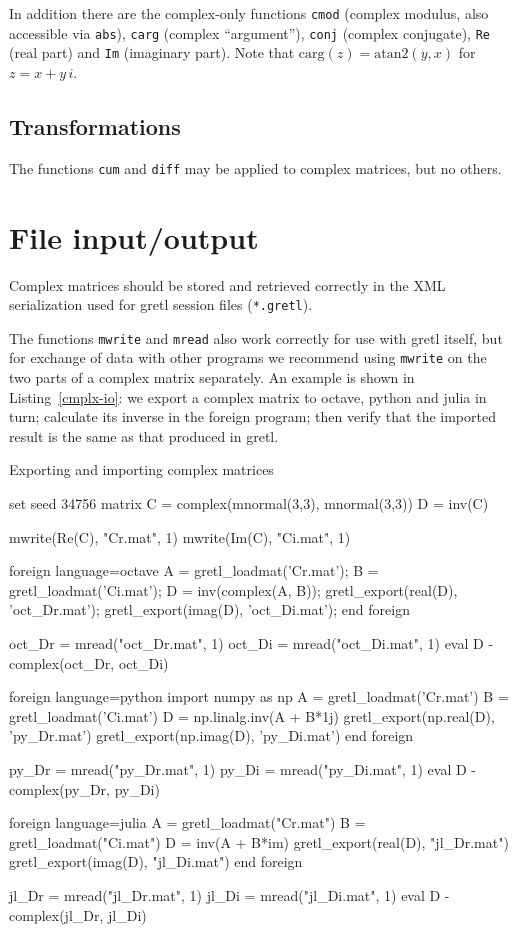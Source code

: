 \documentclass{article}
\begin{document}
In addition there are the complex-only functions \texttt{cmod}
(complex modulus, also accessible via \texttt{abs}), \texttt{carg}
(complex ``argument''), \texttt{conj} (complex conjugate), \texttt{Re}
(real part) and \texttt{Im} (imaginary part). Note that
$\mbox{carg}(z) = \mbox{atan2}(y,x)$ for $z=x + y\,i$.

\subsection{Transformations}

The functions \texttt{cum} and \texttt{diff} may be applied to complex
matrices, but no others.

\section{File input/output}

Complex matrices should be stored and retrieved correctly in the
XML serialization used for gretl session files (\texttt{*.gretl}).

The functions \texttt{mwrite} and \texttt{mread} also work correctly
for use with gretl itself, but for exchange of data with other
programs we recommend using \texttt{mwrite} on the two parts of a
complex matrix separately. An example is shown in
Listing~\ref{cmplx-io}: we export a complex matrix to \textsf{octave},
\textsf{python} and \textsf{julia} in turn; calculate its inverse in
the foreign program; then verify that the imported result is the same
as that produced in gretl.

\begin{script}[htbp]
  \caption{Exporting and importing complex matrices}
  \label{cmplx-io}
\begin{scode}
set seed 34756
matrix C = complex(mnormal(3,3), mnormal(3,3))
D = inv(C)

mwrite(Re(C), "Cr.mat", 1)
mwrite(Im(C), "Ci.mat", 1)

foreign language=octave
  A = gretl_loadmat('Cr.mat');
  B = gretl_loadmat('Ci.mat');
  D = inv(complex(A, B));
  gretl_export(real(D), 'oct_Dr.mat');
  gretl_export(imag(D), 'oct_Di.mat');
end foreign

oct_Dr = mread("oct_Dr.mat", 1)
oct_Di = mread("oct_Di.mat", 1)
eval D - complex(oct_Dr, oct_Di)

foreign language=python
   import numpy as np
   A = gretl_loadmat('Cr.mat')
   B = gretl_loadmat('Ci.mat')
   D = np.linalg.inv(A + B*1j)
   gretl_export(np.real(D), 'py_Dr.mat')
   gretl_export(np.imag(D), 'py_Di.mat')
end foreign

py_Dr = mread("py_Dr.mat", 1)
py_Di = mread("py_Di.mat", 1)
eval D - complex(py_Dr, py_Di)

foreign language=julia
  A = gretl_loadmat("Cr.mat")
  B = gretl_loadmat("Ci.mat")
  D = inv(A + B*im)
  gretl_export(real(D), "jl_Dr.mat")
  gretl_export(imag(D), "jl_Di.mat")
end foreign

jl_Dr = mread("jl_Dr.mat", 1)
jl_Di = mread("jl_Di.mat", 1)
eval D - complex(jl_Dr, jl_Di)
\end{scode}
\end{script}
\end{document}
